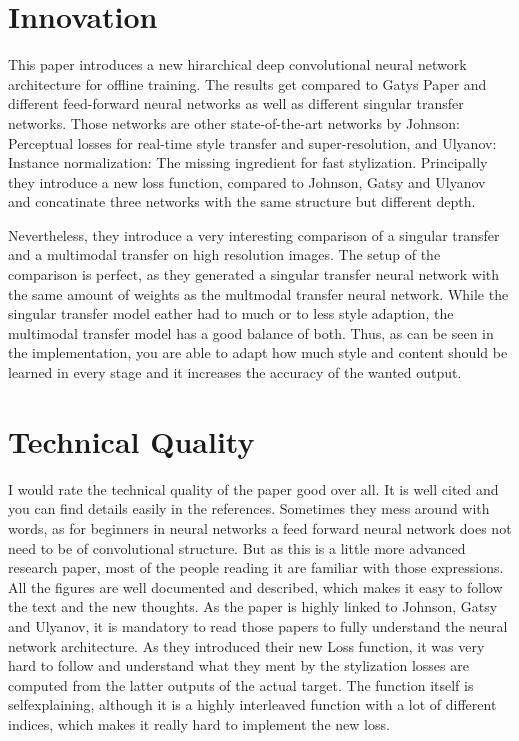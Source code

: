 \documentclass[11pt]{article}
\begin{document}
    \section{Innovation}\label{innovation}

This paper introduces a new hirarchical deep convolutional neural
network architecture for offline training. The results get compared to
Gatys Paper and different feed-forward neural networks as well as
different singular transfer networks. Those networks are other
state-of-the-art networks by Johnson: Perceptual losses for real-time
style transfer and super-resolution, and Ulyanov: Instance
normalization: The missing ingredient for fast stylization. Principally
they introduce a new loss function, compared to Johnson, Gatsy and
Ulyanov and concatinate three networks with the same structure but
different depth.

Nevertheless, they introduce a very interesting comparison of a singular
transfer and a multimodal transfer on high resolution images. The setup
of the comparison is perfect, as they generated a singular transfer
neural network with the same amount of weights as the multmodal transfer
neural network. While the singular transfer model eather had to much or
to less style adaption, the multimodal transfer model has a good balance
of both. Thus, as can be seen in the implementation, you are able to
adapt how much style and content should be learned in every stage and it
increases the accuracy of the wanted output.

    \section{Technical Quality}\label{technical-quality}

I would rate the technical quality of the paper good over all. It is
well cited and you can find details easily in the references. Sometimes
they mess around with words, as for beginners in neural networks a feed
forward neural network does not need to be of convolutional structure.
But as this is a little more advanced research paper, most of the people
reading it are familiar with those expressions. All the figures are well
documented and described, which makes it easy to follow the text and the
new thoughts. As the paper is highly linked to Johnson, Gatsy and
Ulyanov, it is mandatory to read those papers to fully understand the
neural network architecture. As they introduced their new Loss function,
it was very hard to follow and understand what they ment by the
stylization losses are computed from the latter outputs of the actual
target. The function itself is selfexplaining, although it is a highly
interleaved function with a lot of different indices, which makes it
really hard to implement the new loss.
\end{document}
